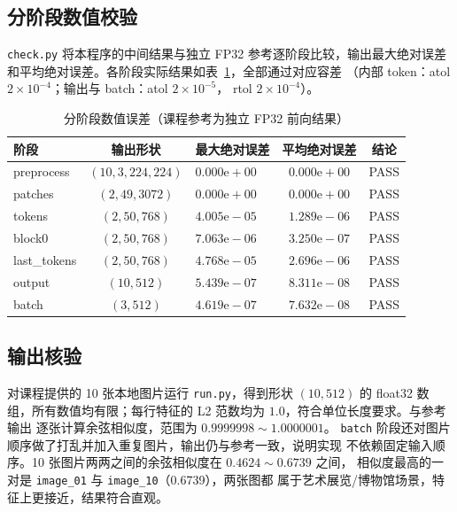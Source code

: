 \documentclass[a4paper,12pt]{article}
\begin{document}
\subsection{分阶段数值校验}
\texttt{check.py} 将本程序的中间结果与独立 FP32 参考逐阶段比较，输出最大绝对误差
和平均绝对误差。各阶段实际结果如表~\ref{tab:stage-err}，全部通过对应容差
（内部 token：atol $2\times10^{-4}$；输出与 batch：atol $2\times10^{-5}$，
rtol $2\times10^{-4}$）。
\begin{table}[H]
    \centering
    \caption{分阶段数值误差（课程参考为独立 FP32 前向结果）}
    \label{tab:stage-err}
    \begin{tabular}{lclcc}
        \toprule
        阶段 & 输出形状 & 最大绝对误差 & 平均绝对误差 & 结论 \\
        \midrule
        preprocess  & $(10,3,224,224)$ & $0.000\mathrm{e}{+}00$ & $0.000\mathrm{e}{+}00$ & PASS \\
        patches     & $(2,49,3072)$    & $0.000\mathrm{e}{+}00$ & $0.000\mathrm{e}{+}00$ & PASS \\
        tokens      & $(2,50,768)$     & $4.005\mathrm{e}{-}05$  & $1.289\mathrm{e}{-}06$ & PASS \\
        block0      & $(2,50,768)$     & $7.063\mathrm{e}{-}06$  & $3.250\mathrm{e}{-}07$ & PASS \\
        last\_tokens& $(2,50,768)$     & $4.768\mathrm{e}{-}05$  & $2.696\mathrm{e}{-}06$ & PASS \\
        output      & $(10,512)$       & $5.439\mathrm{e}{-}07$  & $8.311\mathrm{e}{-}08$ & PASS \\
        batch       & $(3,512)$        & $4.619\mathrm{e}{-}07$  & $7.632\mathrm{e}{-}08$ & PASS \\
        \bottomrule
    \end{tabular}
\end{table}
\subsection{输出核验}
对课程提供的 10 张本地图片运行 \texttt{run.py}，得到形状 $(10,512)$ 的 float32
数组，所有数值均有限；每行特征的 L2 范数均为 $1.0$，符合单位长度要求。与参考输出
逐张计算余弦相似度，范围为 $0.9999998\sim1.0000001$。
\texttt{batch} 阶段还对图片顺序做了打乱并加入重复图片，输出仍与参考一致，说明实现
不依赖固定输入顺序。10 张图片两两之间的余弦相似度在 $0.4624\sim0.6739$ 之间，
相似度最高的一对是 \texttt{image\_01} 与 \texttt{image\_10}（0.6739），两张图都
属于艺术展览/博物馆场景，特征上更接近，结果符合直观。
\end{document}
